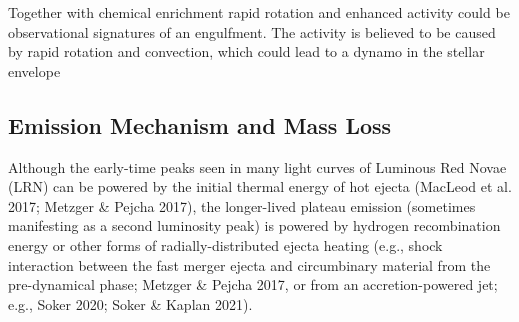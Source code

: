 \documentclass[twocolumn]{aastex62}
\begin{document}
Together with chemical enrichment \citep[e.g. Lithium, see][]{Soares:2021} rapid rotation and enhanced activity could be observational signatures of an engulfment. The activity is believed to be caused by rapid rotation and convection, which could lead to a dynamo in the stellar envelope \citep{Soker:2007,Privitera:2016bf}


\subsection{Emission Mechanism and Mass Loss}\label{sec:emission}
Although the early-time peaks
seen in many light curves of Luminous Red Novae (LRN) can be powered by the initial thermal energy of hot ejecta (MacLeod et al.
2017; Metzger \& Pejcha 2017), the longer-lived plateau
emission (sometimes manifesting as a second luminosity
peak) is powered by hydrogen recombination energy or
other forms of radially-distributed ejecta heating (e.g.,
shock interaction between the fast merger ejecta and circumbinary material from the pre-dynamical phase; Metzger \& Pejcha 2017, or from an accretion-powered jet;
e.g., Soker 2020; Soker \& Kaplan 2021).
\end{document}
